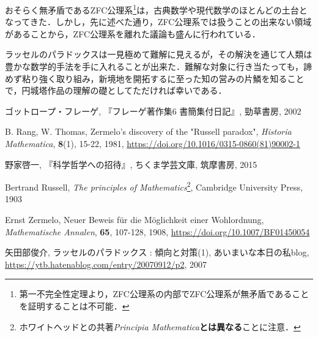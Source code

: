 \documentclass[10pt, a5paper, twoside]{jsarticle}
\theoremstyle{definition}
\begin{document}
		おそらく無矛盾であるZFC公理系\footnote{第一不完全性定理より，ZFC公理系の内部でZFC公理系が無矛盾であることを証明することは不可能．}は，古典数学や現代数学のほとんどの土台となってきた．しかし，先に述べた通り，ZFC公理系では扱うことの出来ない領域があることから，ZFC公理系を離れた議論も盛んに行われている．

		ラッセルのパラドックスは一見極めて難解に見えるが，その解決を通じて人類は豊かな数学的手法を手に入れることが出来た．難解な対象に行き当たっても，諦めず粘り強く取り組み，新境地を開拓するに至った知の営みの片鱗を知ることで，円城塔作品の理解の礎としてただければ幸いである．

	\begin{thebibliography}{99}

		 ゴットロープ・フレーゲ, 『フレーゲ著作集6 書簡集付日記』, 勁草書房, 2002

		 B. Rang, W. Thomas, Zermelo's discovery of the "Russell paradox", \textit{Historia Mathematica}, \textbf{8}(1), 15-22, 1981, \url{https://doi.org/10.1016/0315-0860(81)90002-1}

		 野家啓一, 『科学哲学への招待』, ちくま学芸文庫, 筑摩書房, 2015

		 Bertrand Russell, \textit{The principles of Mathematics}\footnote{ホワイトヘッドとの共著\textit{Principia Mathematica}\textbf{とは異なる}ことに注意．}, Cambridge University Press, 1903

		 Ernst Zermelo, Neuer Beweis für die Möglichkeit einer Wohlordnung, \textit{Mathematische Annalen}, \textbf{65}, 107-128, 1908, \url{https://doi.org/10.1007/BF01450054}

		 矢田部俊介, ラッセルのパラドックス : 傾向と対策(1), あいまいな本日の私blog, \url{https://ytb.hatenablog.com/entry/20070912/p2}, 2007

	\end{thebibliography}
\end{document}

